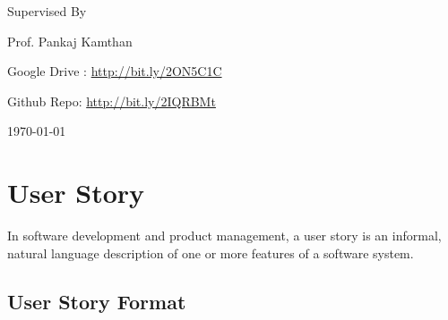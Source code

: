 \documentclass[15pt]{article}
\begin{document}
\begin{titlepage}
    \vspace{0.5cm}

	\vfill

	\vspace{0.2cm}
	{\large Supervised By} \par
    \vspace{0.2cm}
	{\Large Prof. Pankaj Kamthan}

	\vfill
	{\Large Google Drive : \url{http://bit.ly/2ON5C1C}\par}
	\vspace{0.2cm}
    {\Large Github Repo: \url{http://bit.ly/2IQRBMt}}

	\vfill

	{\large \today\par}
	\par
    
\end{titlepage}


\renewcommand{\cftpartfont}{\Large\bfseries}
\renewcommand\cftsecfont{\Large\bfseries}
\renewcommand\cftsecpagefont{\Large\bfseries}
\renewcommand{\cftsubsecfont}{\Large\bfseries}
\renewcommand{\cftsubsecpagefont}{\Large\bfseries}
\renewcommand\cftsecafterpnum{\par\addvspace{6pt}}
\renewcommand\cftloftitlefont{\Large\bfseries}
\renewcommand\cftfigfont{\Large\bfseries}
\renewcommand\cftfigpagefont{\Large\bfseries}




\doublespacing
\tableofcontents
\singlespacing
\setlength{\cftparskip}{1\baselineskip}
\listoffigures

\subsectionfont{\Large}



\newpage
\section{\Large{User Story}}
\Large{In software development and product management, a user story is an informal, natural language description of one or more features of a software system. \cite{cohn2004user}
}
\subsection{\Large{User Story Format}}
\end{document}
